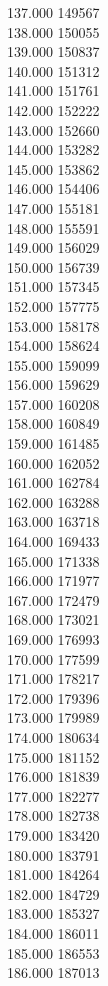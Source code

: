 { 137.000	149567 \\
 138.000	150055 \\
 139.000	150837 \\
 140.000	151312 \\
 141.000	151761 \\
 142.000	152222 \\
 143.000	152660 \\
 144.000	153282 \\
 145.000	153862 \\
 146.000	154406 \\
 147.000	155181 \\
 148.000	155591 \\
 149.000	156029 \\
 150.000	156739 \\
 151.000	157345 \\
 152.000	157775 \\
 153.000	158178 \\
 154.000	158624 \\
 155.000	159099 \\
 156.000	159629 \\
 157.000	160208 \\
 158.000	160849 \\
 159.000	161485 \\
 160.000	162052 \\
 161.000	162784 \\
 162.000	163288 \\
 163.000	163718 \\
 164.000	169433 \\
 165.000	171338 \\
 166.000	171977 \\
 167.000	172479 \\
 168.000	173021 \\
 169.000	176993 \\
 170.000	177599 \\
 171.000	178217 \\
 172.000	179396 \\
 173.000	179989 \\
 174.000	180634 \\
 175.000	181152 \\
 176.000	181839 \\
 177.000	182277 \\
 178.000	182738 \\
 179.000	183420 \\
 180.000	183791 \\
 181.000	184264 \\
 182.000	184729 \\
 183.000	185327 \\
 184.000	186011 \\
 185.000	186553 \\
 186.000	187013 \\
}
